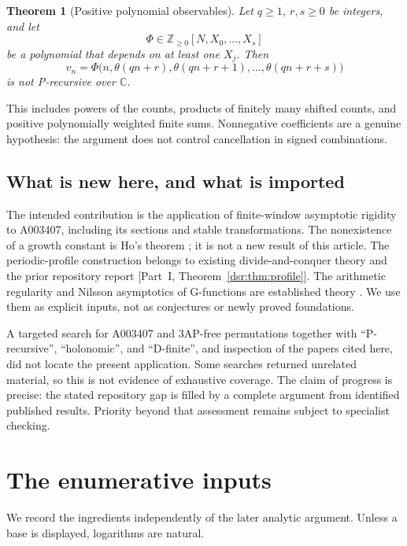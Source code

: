 \documentclass[11pt,a4paper]{article}
\numberwithin{equation}{section}
\newtheorem{theorem}{Theorem}[section]
\theoremstyle{definition}
\theoremstyle{remark}
\newcommand{\Z}{\mathbb Z}
\newcommand{\C}{\mathbb C}
\newcommand{\tht}{\theta}
\newcommand{\partref}[1]{\textup{[}Part~I, #1\textup{]}}
\theoremstyle{definition}
\theoremstyle{plain}
\begin{document}
\begin{theorem}[Positive polynomial observables]
\label{dsr:nh:thm:polyintro}
Let $q\ge1$, $r,s\ge0$ be integers, and let
\[
\Phi\in\Z_{\ge0}[N,X_0,\ldots,X_s]
\]
be a polynomial that depends on at least one $X_j$. Then
\begin{equation}
v_n=\Phi\bigl(n,\tht(qn+r),\tht(qn+r+1),\ldots,\tht(qn+r+s)\bigr)
\label{dsr:nh:eq:observable}
\end{equation}
is not P-recursive over $\C$.
\end{theorem}
This includes powers of the counts, products of finitely many shifted
counts, and positive polynomially weighted finite sums. Nonnegative
coefficients are a genuine hypothesis: the argument does not control
cancellation in signed combinations.

\subsection{What is new here, and what is imported}
The intended contribution is the application of finite-window asymptotic
rigidity to A003407, including its sections and stable transformations.
The nonexistence of a growth constant is Ho's theorem \cite{Ho}; it is not a
new result of this article. The periodic-profile construction belongs to
existing divide-and-conquer theory \cite{HJT} and the prior repository report
\partref{Theorem~\ref{dsr:thm:profile}}. The arithmetic regularity and Nilsson asymptotics of
G-functions are established theory \cite{Gar09,Gar11,Andre}. We use them as
explicit inputs, not as conjectures or newly proved foundations.

A targeted search for A003407 and 3AP-free permutations together with
``P-recursive'', ``holonomic'', and ``D-finite'', and inspection of the
papers cited here, did not locate the present application. Some searches
returned unrelated material, so this is not evidence of exhaustive coverage.
The claim of progress is precise: the stated repository gap is filled by
a complete argument from identified published results. Priority beyond
that assessment remains subject to specialist checking.

\section{The enumerative inputs}
\label{dsr:nh:sec:counts}
We record the ingredients independently of the later analytic argument.
Unless a base is displayed, logarithms are natural.
\end{document}
